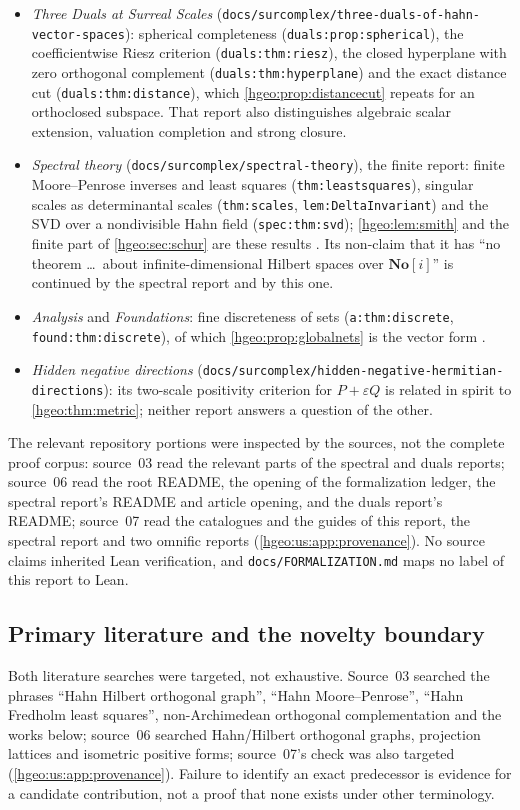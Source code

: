 \documentclass[11pt,letterpaper]{article}
\numberwithin{equation}{section}
\theoremstyle{definition}
\theoremstyle{remark}
\newcommand{\No}{\mathbf{No}}
\newcommand{\replabel}[1]{\nolinkurl{#1}}
\newcommand{\fn}[1]{\nolinkurl{#1}}
\begin{document}
\begin{itemize}[leftmargin=*]
\item \emph{Three Duals at Surreal Scales}
(\fn{docs/surcomplex/three-duals-of-hahn-vector-spaces}): spherical
completeness (\replabel{duals:prop:spherical}), the coefficientwise Riesz
criterion (\replabel{duals:thm:riesz}), the closed hyperplane with zero
orthogonal complement (\replabel{duals:thm:hyperplane}) and the exact
distance cut (\replabel{duals:thm:distance}), which
\cref{hgeo:prop:distancecut} repeats for an orthoclosed subspace. That report
also distinguishes algebraic scalar extension, valuation completion and
strong closure.
\item \emph{Spectral theory} (\fn{docs/surcomplex/spectral-theory}), the
finite report: finite Moore--Penrose inverses and least squares
(\replabel{thm:leastsquares}), singular scales as determinantal scales
(\replabel{thm:scales}, \replabel{lem:DeltaInvariant}) and the SVD over a
nondivisible Hahn field (\replabel{spec:thm:svd}); \cref{hgeo:lem:smith} and
the finite part of \cref{hgeo:sec:schur} are these results
\cite{RepoFinite}. Its non-claim that it has ``no theorem \ldots\ about
infinite-dimensional Hilbert spaces over $\No[i]$'' is continued by the
spectral report and by this one.
\item \emph{Analysis} and \emph{Foundations}: fine discreteness of sets
(\replabel{a:thm:discrete}, \replabel{found:thm:discrete}), of which
\cref{hgeo:prop:globalnets} is the vector form \cite{RepoAnalysis,RepoFound}.
\item \emph{Hidden negative directions}
(\fn{docs/surcomplex/hidden-negative-hermitian-directions}): its two-scale
positivity criterion for $P+\varepsilon Q$ is related in spirit to
\cref{hgeo:thm:metric}; neither report answers a question of the other.
\end{itemize}
The relevant repository portions were inspected by the sources, not the
complete proof corpus: source~03 read the relevant parts of the spectral and
duals reports; source~06 read the root README, the opening of the
formalization ledger, the spectral report's README and article opening, and
the duals report's README; source~07 read the catalogues and the guides of
this report, the spectral report and two omnific reports
(\cref{hgeo:us:app:provenance}). No source claims inherited Lean
verification, and \fn{docs/FORMALIZATION.md} maps no label of this report to
Lean.

\subsection{Primary literature and the novelty boundary}
\label{hgeo:sub:literature}
Both literature searches were targeted, not exhaustive. Source~03 searched
the phrases ``Hahn Hilbert orthogonal graph'', ``Hahn Moore--Penrose'',
``Hahn Fredholm least squares'', non-Archimedean orthogonal complementation
and the works below; source~06 searched Hahn/Hilbert orthogonal graphs,
projection lattices and isometric positive forms; source~07's check was also
targeted (\cref{hgeo:us:app:provenance}). Failure to identify an
exact predecessor is evidence for a candidate contribution, not a proof that
none exists under other terminology.
\end{document}
